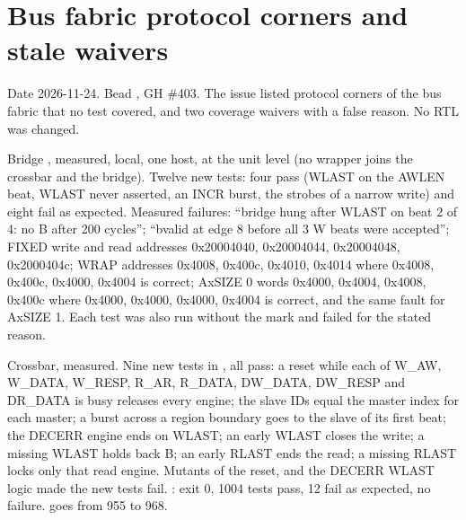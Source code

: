 \section{Bus fabric protocol corners and stale  waivers}\label{cr:defect:fabric-protocol-corners}

\begin{record}

Date 2026-11-24. Bead , GH \#403. The issue listed protocol corners of the bus fabric that no test covered, and two coverage waivers with a false reason. No RTL was changed.

\end{record}

\begin{record}

Bridge , measured, local, one host, at the unit level (no wrapper joins the crossbar and the bridge). Twelve new tests: four pass (WLAST on the AWLEN beat, WLAST never asserted, an INCR burst, the strobes of a narrow write) and eight fail as expected. Measured failures: ``bridge hung after WLAST on beat 2 of 4: no B after 200 cycles''; ``bvalid at edge 8 before all 3 W beats were accepted''; FIXED write and read addresses 0x20004040, 0x20004044, 0x20004048, 0x2000404c; WRAP addresses 0x4008, 0x400c, 0x4010, 0x4014 where 0x4008, 0x400c, 0x4000, 0x4004 is correct; AxSIZE 0 words 0x4000, 0x4004, 0x4008, 0x400c where 0x4000, 0x4000, 0x4000, 0x4004 is correct, and the same fault for AxSIZE 1. Each test was also run without the mark and failed for the stated reason.

\end{record}

\begin{record}

Crossbar, measured. Nine new tests in , all pass: a reset while each of W\_AW, W\_DATA, W\_RESP, R\_AR, R\_DATA, DW\_DATA, DW\_RESP and DR\_DATA is busy releases every engine; the slave IDs equal the master index for each master; a burst across a region boundary goes to the slave of its first beat; the DECERR engine ends on WLAST; an early WLAST closes the write; a missing WLAST holds back B; an early RLAST ends the read; a missing RLAST locks only that read engine. Mutants of the reset,  and the DECERR WLAST logic made the new tests fail. : exit 0, 1004 tests pass, 12 fail as expected, no failure.  goes from 955 to 968.

\end{record}


